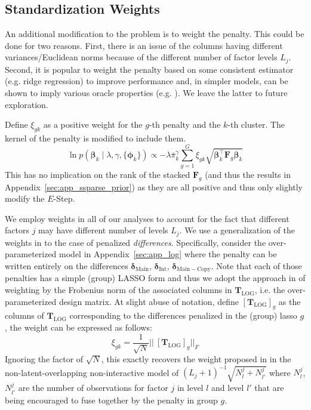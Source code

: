 \subsection{Standardization Weights}
\label{sec:app_extensions_standardization}

An additional modification to the problem is to weight the
penalty. This could be done for two reasons.  First, there is an issue
of the columns having different variances/Euclidean norms because of
the different number of factor levels $L_j$. Second, it is popular to
weight the penalty based on some consistent estimator (e.g. ridge
regression) to improve performance and, in simpler models, can be
shown to imply various oracle properties
(e.g. \citealt{zou2006adaptive}). We leave the latter to future
exploration.

Define $\xi_{gk}$ as a positive weight for the $g$-th penalty and the
$k$-th cluster. The kernel of the penalty is modified to include
them. 
\begin{equation}
\ln p(\bm{\beta}_k \mid \lambda, \gamma, \{\bm{\phi}_k\}) \propto -\lambda \bar{\pi}_k^\gamma \sum_{g=1}^G \xi_{gk} \sqrt{\bm{\beta}_k^\top \bm{F}_g \bm{\beta}_k}
\end{equation}
This has no implication on the rank of the stacked $\bm{F}_g$ (and
thus the results in Appendix~\ref{sec:app_ssparse_prior}) as they are
all positive and thus only slightly modify the $E$-Step. 

We employ weights in all of our analyses to account for the fact that
different factors $j$ may have different number of levels $L_j$. We
use a generalization of the weights in \cite{bondell2009anova} to the
case of penalized \emph{differences}. Specifically, consider the
over-parameterized model in Appendix~\ref{sec:app_log} where the
penalty can be written entirely on the differences
$\bm{\delta}_{\mathrm{Main}}$, $\bm{\delta}_{\mathrm{Int}}$,
$\bm{\delta}_{\mathrm{Main-Copy}}$.  Note that each of those penalties
has a simple (group) LASSO form and thus we adopt the approach in
\cite{lim2015learning} of weighting by the Frobenius norm of the
associated columns in $\bm{T}_{\mathrm{LOG}}$, i.e. the
over-parameterized design matrix. At slight abuse of notation, define
$[\bm{T}_{\mathrm{LOG}}]_g$ as the columns of $\bm{T}_{\mathrm{LOG}}$
corresponding to the differences penalized in the (group) lasso $g$,
the weight can be expressed as follows:
$$\xi_{gk} = \frac{1}{\sqrt{N}}||~\left[\bm{T}_{\mathrm{LOG}}\right]_{g} ||_F$$
Ignoring the factor of $\sqrt{N}$, this exactly recovers the weight proposed in \cite{bondell2009anova} in the non-latent-overlapping non-interactive model of $(L_j + 1)^{-1} \sqrt{N^j_{l} + N^j_{l'}}$ where $N^j_l$, $N^j_{l'}$ are the number of observations for factor $j$ in level $l$ and level $l'$ that are being encouraged to fuse together by the penalty in group $g$.



